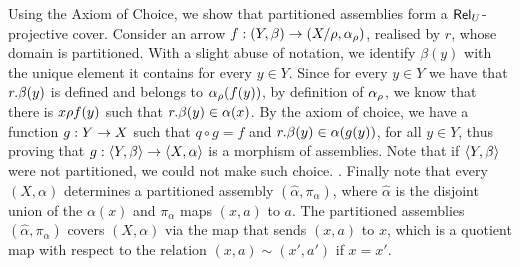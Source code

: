 \begin{example}
Using the Axiom of Choice, we show that partitioned assemblies form a $\mathsf{Rel}_U$-projective cover. 
Consider an arrow $\fun{f}{(Y,\beta)}{(X/\eqrelr, \alpha_\eqrelr)}$, realised by $r$, whose domain is partitioned. 
With a slight abuse of notation, we identify $\beta(y)$ with the unique element it contains for every $y \in Y$. 
Since for every $y \in Y$ we have that $r. \beta(y)$ is defined and belongs to $\alpha_\rho(f(y))$, by definition of $\alpha_\rho$, we know that there is $x\rho f(y)$ such that $r. \beta(y) \in \alpha(x)$. 
By the axiom of choice, we have a function 
$\fun{g}{Y}{X}$ such that $q\circ g = f$ and $r.\beta(y) \in \alpha(g(y))$, for all $y\in Y$, thus proving that 
$\fun{g}{\ple{Y,\beta}}{\ple{X,\alpha}}$ is a morphism of assemblies. 
Note that if ${\langle Y,\beta \rangle }$ were not partitioned, we could not make such choice. 
% 
. Finally note that every $(X,\alpha)$ determines a partitioned assembly $(\widehat{\alpha},\pi_\alpha)$, where  $\widehat{\alpha}$ is the disjoint union of the $\alpha(x)$ and $\pi_\alpha$ maps $(x,a)$ to $a$. The partitioned assemblies $(\widehat{\alpha},\pi_\alpha)$ covers $(X,\alpha)$ via the map that sends $(x,a)$ to $x$, which is a quotient map with respect to the relation $(x,a)\sim (x',a')$ if $x=x'$.
\end{example}

